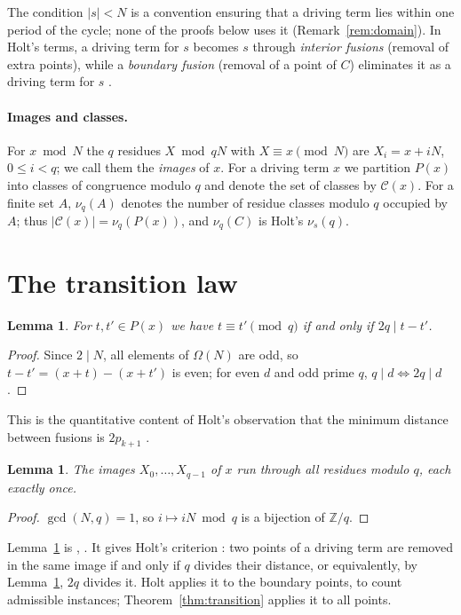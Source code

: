 \documentclass[11pt]{article}
\newtheorem{lemma}[theorem]{Lemma}
\theoremstyle{definition}
\theoremstyle{remark}
\newcommand{\C}{\mathcal{C}}
\begin{document}
The condition $|s| < N$ is a convention ensuring that a driving term lies within one period of the cycle; none of the proofs below uses it (Remark~\ref{rem:domain}). In Holt's terms, a driving term for $s$ becomes $s$ through \emph{interior fusions} (removal of extra points), while a \emph{boundary fusion} (removal of a point of $C$) eliminates it as a driving term for $s$ \cite[\S2.1]{Ho26}.

\paragraph{Images and classes.} For $x \bmod N$ the $q$ residues $X \bmod qN$ with $X \equiv x \pmod N$ are $X_i = x + iN$, $0 \le i < q$; we call them the \emph{images} of $x$. For a driving term $x$ we partition $P(x)$ into classes of congruence modulo $q$ and denote the set of classes by $\C(x)$. For a finite set $A$, $\nu_q(A)$ denotes the number of residue classes modulo $q$ occupied by $A$; thus $|\C(x)| = \nu_q(P(x))$, and $\nu_q(C)$ is Holt's $\nu_s(q)$.

\section{The transition law}\label{sec:transition}

\begin{lemma}\label{lem:parity}
For $t, t' \in P(x)$ we have $t \equiv t' \pmod q$ if and only if $2q \mid t - t'$.
\end{lemma}

\begin{proof}
Since $2 \mid N$, all elements of $\Omega(N)$ are odd, so $t - t' = (x+t) - (x+t')$ is even; for even $d$ and odd prime $q$, $q \mid d \iff 2q \mid d$.
\end{proof}

This is the quantitative content of Holt's observation that the minimum distance between fusions is $2p_{k+1}$ \cite[Obs.~2.3]{Ho26}.

\begin{lemma}\label{lem:images}
The images $X_0, \dots, X_{q-1}$ of $x$ run through all residues modulo $q$, each exactly once.
\end{lemma}

\begin{proof}
$\gcd(N, q) = 1$, so $i \mapsto iN \bmod q$ is a bijection of $\mathbb{Z}/q$.
\end{proof}

Lemma~\ref{lem:images} is \cite[Lemma~4.1]{Ho25}, \cite[Lemma~2.6]{Ho26}. It gives Holt's criterion \cite[Lemma~3.1]{Ho25}: two points of a driving term are removed in the same image if and only if $q$ divides their distance, or equivalently, by Lemma~\ref{lem:parity}, $2q$ divides it. Holt applies it to the boundary points, to count admissible instances; Theorem~\ref{thm:transition} applies it to all points.
\end{document}
